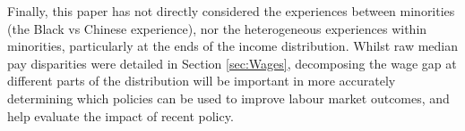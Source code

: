 \documentclass[class=article, crop=false]{standalone}
\begin{document}

Finally, this paper has not directly considered the experiences between minorities (the Black vs Chinese experience), nor the heterogeneous experiences within minorities, particularly at the ends of the income distribution. Whilst raw median pay disparities were detailed in Section \ref{sec:Wages}, decomposing the wage gap at different parts of the distribution will be important in more accurately determining which policies can be used to improve labour market outcomes, and help evaluate the impact of recent policy.

\ifstandalone

\fi
\end{document}

